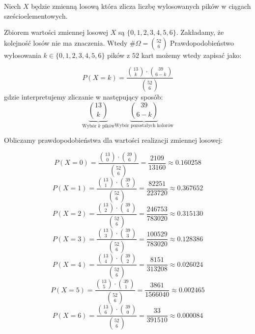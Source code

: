\documentclass{article}
\begin{document}
Niech \(X\) będzie zmienną losową która zlicza liczbę wylosowanych pików w ciągach sześcioelementowych.
\par Zbiorem wartości zmiennej losowej \(X\) są \(\{0, 1, 2, 3, 4, 5, 6\}\). Zakładamy, że kolejność losów nie ma znaczenia.
Wtedy \(\# \Omega = {\binom{52}{6}}\)
Prawdopodobieństwo wylosowania \(k \in \{0, 1, 2, 3, 4, 5, 6\}\) pików z \(52\) kart możemy wtedy zapisać jako:

\begin{equation*}
    P(X = k) = \frac{\binom{13}{k} \cdot \binom{39}{6 - k}}{\binom{52}{6}}
\end{equation*}
gdzie interpretujemy zliczanie w następujący sposób:
\begin{equation*}
    \underbrace{\binom{13}{k}}_\text{Wybór \(k\) pików} \underbrace{\binom{39}{6 - k}}_\text{Wybór pozostałych kolorów}
\end{equation*}

Obliczamy prawdopodobieństwa dla wartości realizacji zmiennej losowej:

\begin{equation*}
    P(X = 0) = \frac{\binom{13}{0} \cdot \binom{39}{6}}{\binom{52}{6}} = \frac{2109}{13160} \approx 0.160258
\end{equation*}
\begin{equation*}
    P(X = 1) = \frac{\binom{13}{1} \cdot \binom{39}{5}}{\binom{52}{6}} = \frac{82251}{223720} \approx 0.367652
\end{equation*}
\begin{equation*}
    P(X = 2) = \frac{\binom{13}{2} \cdot \binom{39}{4}}{\binom{52}{6}} = \frac{246753}{783020} \approx 0.315130
\end{equation*}
\begin{equation*}
    P(X = 3) = \frac{\binom{13}{3} \cdot \binom{39}{3}}{\binom{52}{6}} = \frac{100529}{783020} \approx 0.128386
\end{equation*}
\begin{equation*}
    P(X = 4) = \frac{\binom{13}{4} \cdot \binom{39}{2}}{\binom{52}{6}} = \frac{8151}{313208} \approx 0.026024
\end{equation*}
\begin{equation*}
    P(X = 5) = \frac{\binom{13}{5} \cdot \binom{39}{1}}{\binom{52}{6}} = \frac{3861}{1566040} \approx 0.002465
\end{equation*}
\begin{equation*}
    P(X = 6) = \frac{\binom{13}{6} \cdot \binom{39}{0}}{\binom{52}{6}} = \frac{33}{391510} \approx 0.000084
\end{equation*}
\end{document}

